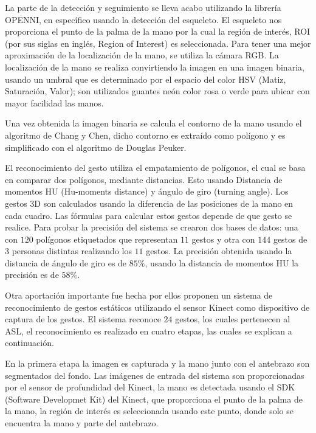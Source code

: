 La parte de la detección y seguimiento  se lleva acabo utilizando la librería OPENNI, en específico usando la detección del esqueleto. El esqueleto nos proporciona el punto de la palma de la mano por la cual la región de interés, ROI (por sus siglas en inglés, Region of Interest) es seleccionada. Para tener una  mejor aproximación de la localización de la mano, se utiliza la cámara RGB. La localización de la mano se realiza convirtiendo la imagen en una imagen binaria, usando un umbral que es determinado por el espacio del color HSV (Matiz, Saturación, Valor); son utilizados guantes neón color rosa o verde para ubicar con mayor facilidad las manos.   

Una vez obtenida la imagen binaria se calcula el contorno de la mano usando el algoritmo de Chang y Chen, dicho contorno es extraído como polígono y  es simplificado con el algoritmo de Douglas Peuker. 

El reconocimiento del gesto utiliza el empatamiento de polígonos, el cual se basa en comparar dos polígonos, mediante distancias. Esto usando Distancia de momentos HU (Hu-moments distance) y ángulo de giro (turning angle). 
Los gestos 3D son calculados usando la diferencia de las posiciones de la mano en cada cuadro. Las fórmulas para calcular estos gestos depende de que gesto se  realice.  
Para probar la precisión del sistema se crearon dos bases de datos: una con $120$ polígonos etiquetados que representan $11$ gestos y otra con $144$ gestos de $3$ personas distintas realizando los $11$ gestos. La precisión obtenida usando la distancia de ángulo de giro es de $85 \%$, usando la distancia de momentos HU la precisión es de $58 \%$.  


Otra aportación importante fue hecha por \citep{Kang2013} ellos proponen un sistema de reconocimiento de  gestos estáticos utilizando el sensor Kinect como dispositivo de captura de los gestos. El sistema reconoce $24$ gestos, los cuales pertenecen al ASL, el reconocimiento es realizado en cuatro etapas, las cuales se explican a continuación.  

En la primera etapa la imagen es capturada y la mano junto con el antebrazo son segmentados del fondo. Las imágenes de entrada del sistema son proporcionadas por el sensor de profundidad del Kinect, la mano es detectada usando el SDK (Software Developmet Kit) del Kinect, que proporciona el punto de la palma de la mano, la región de interés es seleccionada usando este punto, donde  solo se encuentra la mano y parte del antebrazo.   


